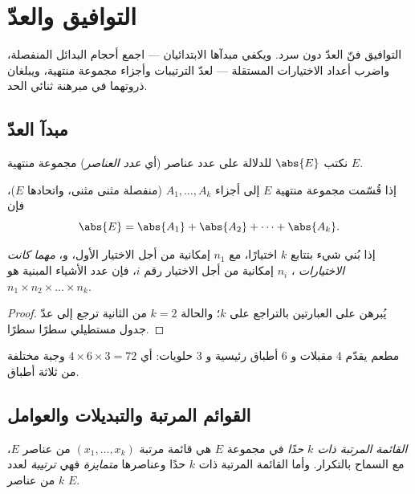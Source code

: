 \chapter{التوافيق والعدّ}\label{ch:g12:comb}

التوافيق فنّ العدّ دون سرد. ويكفي مبدآها الابتدائيان
--- اجمع أحجام البدائل المنفصلة، واضرب أعداد
الاختيارات المستقلة --- لعدّ الترتيبات 
وأجزاء مجموعة منتهية، ويبلغان ذروتهما في مبرهنة ثنائي الحد.

\section{مبدآ العدّ}

نكتب $\abs{E}$ للدلالة على عدد عناصر (أي \emph{عدد العناصر}) مجموعة
منتهية $E$.

\begin{proposition}\label{prop:g12:comb:addition}
إذا قُسّمت مجموعة منتهية $E$ إلى أجزاء $A_1, \dots, A_k$ (منفصلة
مثنى مثنى، واتحادها $E$)، فإن
\[
\abs{E} = \abs{A_1} + \abs{A_2} + \dots + \abs{A_k}.
\]
\end{proposition}

\begin{proposition}\label{prop:g12:comb:multiplication}
إذا بُني شيء بتتابع $k$ اختيارًا، مع $n_1$ إمكانية من أجل
الاختيار الأول، و، \emph{مهما كانت الاختيارات }، $n_i$ إمكانية من أجل
الاختيار رقم $i$، فإن عدد الأشياء المبنية هو
$n_1 \times n_2 \times \dots \times n_k$.
\end{proposition}

\begin{proof}
يُبرهن على العبارتين بالتراجع على $k$؛ والحالة $k = 2$ من
الثانية ترجع إلى عدّ جدول مستطيلي سطرًا سطرًا.
\end{proof}

\begin{example}
مطعم يقدّم 4 مقبلات و 6 أطباق رئيسية و 3 حلويات: أي $4 \times 6 \times 3 =
72$ وجبة مختلفة من ثلاثة أطباق.
\end{example}

\section{القوائم المرتبة والتبديلات والعوامل}

\begin{definition}\label{def:g12:comb:tuples}
\emph{القائمة المرتبة ذات $k$ حدًا} في مجموعة $E$ هي قائمة مرتبة $(x_1, \dots, x_k)$ من
عناصر $E$، مع السماح بالتكرار. وأما القائمة المرتبة ذات $k$ حدًا وعناصرها
\emph{متمايزة} فهي \emph{ترتيبة} لعدد $k$ من عناصر $E$.
\end{definition}

